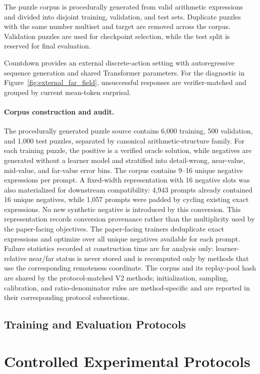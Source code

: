 \documentclass[sigconf,anonymous,review]{acmart}
\theoremstyle{acmdefinition}
\begin{document}
The puzzle corpus is procedurally generated from valid arithmetic
expressions and divided into disjoint training, validation, and test
sets. Duplicate puzzles with the same number multiset and target are
removed across the corpus. Validation puzzles are used for checkpoint
selection, while the test split is reserved for final evaluation.

Countdown provides an external discrete-action setting with
autoregressive sequence generation and shared Transformer parameters.
For the diagnostic in Figure~\ref{fig:external_far_field}, unsuccessful
responses are verifier-matched and grouped by current mean-token surprisal.

\paragraph{Corpus construction and audit.}
The procedurally generated puzzle source contains 6{,}000 training,
500 validation, and 1{,}000 test puzzles, separated by canonical
arithmetic-structure family. For each training puzzle, the positive is
a verified oracle solution, while negatives are generated without a
learner model and stratified into detail-wrong, near-value,
mid-value, and far-value error bins. The corpus contains 9--16 unique
negative expressions per prompt. A fixed-width representation with
16 negative slots was also materialized for downstream compatibility:
4{,}943 prompts already contained 16 unique negatives, while 1{,}057
prompts were padded by cycling existing exact expressions. No new
synthetic negative is introduced by this conversion. This representation
records conversion provenance rather than the multiplicity used by the
paper-facing objectives. The paper-facing trainers deduplicate exact
expressions and optimize over all unique negatives available for each
prompt. Failure statistics recorded at construction time are for
analysis only: learner-relative near/far status is never stored and is
recomputed only by methods that use the corresponding remoteness
coordinate. The corpus and its replay-pool hash are shared by the
protocol-matched V2 methods; initialization, sampling, calibration,
and ratio-denominator rules are method-specific and are reported in
their corresponding protocol subsections.

\subsection{Training and Evaluation Protocols}

\section{Controlled Experimental Protocols}
\label{app:controlled_protocols}
\end{document}
